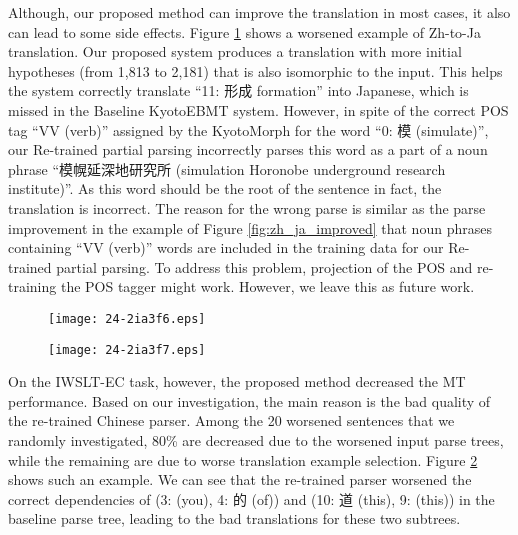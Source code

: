 \documentclass[english]{jnlp_1.4}
\begin{document}
Although, our proposed method can improve the translation in most cases, it also can lead to some
side effects. Figure \ref{fig:zh_ja_decreased} shows a worsened example of Zh-to-Ja translation.
Our proposed system produces a translation with more initial hypotheses (from 1,813 to 2,181) that is also 
isomorphic to the input. This helps the system correctly translate ``11: 形成 formation'' into 
Japanese, which is missed in the Baseline KyotoEBMT system. However, in spite of the correct POS tag 
``VV (verb)'' assigned by the KyotoMorph for the word ``0: 模 (simulate)'', our Re-trained partial 
parsing incorrectly parses this word as a part of a noun phrase ``模幌延深地研究所 (simulation
Horonobe underground research institute)''. As this 
word should be the root of the sentence in fact, the translation is incorrect. The reason for the 
wrong parse is similar as the parse improvement in the example of Figure \ref{fig:zh_ja_improved} 
that noun phrases containing ``VV (verb)'' words are included in the training data for our Re-trained 
partial parsing. To address this problem, projection of the POS and re-training the POS tagger might 
work. However, we leave this as future work.

\begin{figure}[t]
\begin{center}
\texttt{[image: 24-2ia3f6.eps]}
\end{center}
\label{fig:zh_ja_decreased}
\end{figure}
\begin{figure}[t]
\begin{center}
\texttt{[image: 24-2ia3f7.eps]}
\end{center}
\label{fig:zh_ja_decreased_iwslt}
\vspace{-0.5\Cvs}
\end{figure}

On the IWSLT-EC task, however, the proposed method decreased the MT performance.
Based on our investigation, the main reason is the bad quality of the re-trained Chinese parser.
{Among the 20 worsened sentences that we randomly investigated, 80\% are
decreased due to the worsened input parse trees, while the remaining are due to worse
translation example selection.}
Figure \ref{fig:zh_ja_decreased_iwslt} shows such an example. We can see that the re-trained
parser worsened the correct dependencies of (3:  (you), 4: 的 (of)) and (10: 道 (this), 9:  (this))
in the baseline parse tree, leading to the bad translations for these two subtrees.
\end{document}
